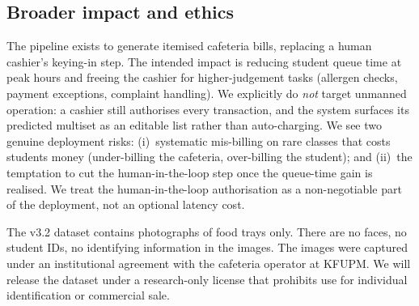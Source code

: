 \subsection{Broader impact and ethics}
\label{sec:ethics}

The pipeline exists to generate itemised cafeteria bills, replacing a
human cashier's keying-in step. The intended impact is reducing student
queue time at peak hours and freeing the cashier for higher-judgement
tasks (allergen checks, payment exceptions, complaint handling). We
explicitly do \emph{not} target unmanned operation: a cashier still
authorises every transaction, and the system surfaces its predicted
multiset as an editable list rather than auto-charging. We see two
genuine deployment risks: (i)~systematic mis-billing on rare classes
that costs students money (under-billing the cafeteria, over-billing the
student); and (ii)~the temptation to cut the human-in-the-loop step
once the queue-time gain is realised. We treat the human-in-the-loop
authorisation as a non-negotiable part of the deployment, not an
optional latency cost.

The v3.2 dataset contains photographs of food trays only. There are no
faces, no student IDs, no identifying information in the images. The
images were captured under an institutional agreement with the
cafeteria operator at KFUPM. We will release the dataset under a
research-only license that prohibits use for individual identification
or commercial sale.
